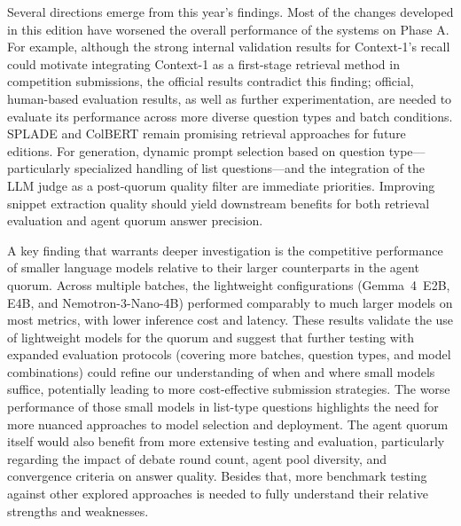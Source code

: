 Several directions emerge from this year's findings. Most of the changes developed in this edition have worsened the overall performance of the systems on Phase A. For example, although the strong internal validation results for Context-1's recall could motivate integrating Context-1 as a first-stage retrieval method in competition submissions, the official results contradict this finding; official, human-based evaluation results, as well as further experimentation, are needed to evaluate its performance across more diverse question types and batch conditions. SPLADE and ColBERT remain promising retrieval approaches for future editions. For generation, dynamic prompt selection based on question type---particularly specialized handling of list questions---and the integration of the LLM judge as a post-quorum quality filter are immediate priorities. Improving snippet extraction quality should yield downstream benefits for both retrieval evaluation and agent quorum answer precision.

A key finding that warrants deeper investigation is the competitive performance of smaller language models relative to their larger counterparts in the agent quorum. Across multiple batches, the lightweight configurations (Gemma~4~E2B, E4B, and Nemotron-3-Nano-4B) performed comparably to much larger models on most metrics, with lower inference cost and latency. These results validate the use of lightweight models for the quorum and suggest that further testing with expanded evaluation protocols (covering more batches, question types, and model combinations) could refine our understanding of when and where small models suffice, potentially leading to more cost-effective submission strategies. The worse performance of those small models in list-type questions highlights the need for more nuanced approaches to model selection and deployment. The agent quorum itself would also benefit from more extensive testing and evaluation, particularly regarding the impact of debate round count, agent pool diversity, and convergence criteria on answer quality. Besides that, more benchmark testing against other explored approaches is needed to fully understand their relative strengths and weaknesses.
